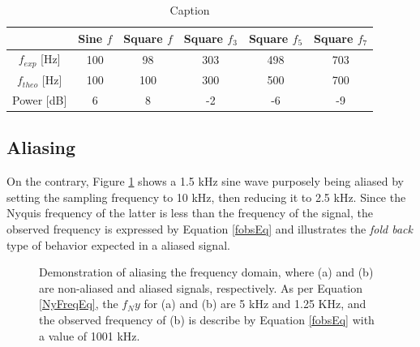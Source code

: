 \documentclass[letterpaper,12pt]{article}
\begin{document}
\begin{table}[ht]
    \centering
    \begin{tabular}{c|c||c|c|c|c}
         & Sine $f$ & Square $f$ & Square $f_3$ & Square $f_5$ & Square $f_7$ \\ \hline
         $f_{exp}$ [Hz] & 100  & 98  & 303 & 498 & 703\\ \hline
         $f_{theo}$ [Hz] & 100 & 100 & 300 & 500 & 700\\ \hline
         Power [dB] & 6 & 8 & -2 & -6 & -9
    \end{tabular}
    \caption{Caption}
    \label{knownSignalTable}
\end{table}

\subsection{Aliasing}
On the contrary, Figure \ref{Part2FreqDomain} shows a 1.5 kHz sine wave purposely being aliased by setting the sampling frequency to 10 kHz, then reducing it to 2.5 kHz. Since the Nyquis frequency of the latter is less than the frequency of the signal, the observed frequency is expressed by Equation \ref{fobsEq} and illustrates the \emph{fold back} type of behavior expected in a aliased signal.

\begin{figure}[ht]
\centering
{}
\quad
{}
\caption{Demonstration of aliasing the frequency domain, where (a) and (b) are non-aliased and aliased signals, respectively. As per Equation \ref{NyFreqEq}, the $f_Ny$ for (a) and (b) are 5 kHz and 1.25 KHz, and the observed frequency of (b) is describe by Equation \ref{fobsEq} with a value of 1001 kHz.}
\label{Part2FreqDomain}
\end{figure}
\end{document}
